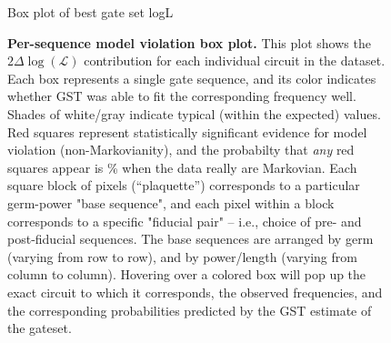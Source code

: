 \documentclass{article}[11pt]
\newcommand{\putfield}[2]{#2}
\begin{document}
{{\begin{figure}
  \begin{center}
    \begin{adjustbox}{max width=\textwidth}
      \putfield{bestEstimateColorBoxPlotPages}{Box plot of best gate set logL}
    \end{adjustbox}
    \caption{\textbf{Per-sequence model violation box plot.}  This plot shows the $2\Delta\log(\mathcal{L})$ contribution for each individual circuit in the dataset.  Each box represents a single gate sequence, and its color indicates whether GST was able to fit the corresponding frequency well.  Shades of white/gray indicate typical (within the expected) values. Red squares represent statistically significant evidence for model violation (non-Markovianity), and the probabilty that \emph{any} red squares appear is \putfield{linlg_pcntle}{}\% when the data really are Markovian. Each square block of pixels (``plaquette'') corresponds to a particular germ-power "base sequence", and each pixel within a block corresponds to a specific "fiducial pair" -- i.e., choice of pre- and post-fiducial sequences.  The base sequences are arranged by germ (varying from row to row), and by power/length (varying from column to column).  Hovering over a colored box will pop up the exact circuit to which it corresponds, the observed frequencies, and the corresponding probabilities predicted by the GST estimate of the gateset.\label{bestEstimateColorBoxPlot}}
\end{center}
\end{figure}

}{}


}
\end{document}
